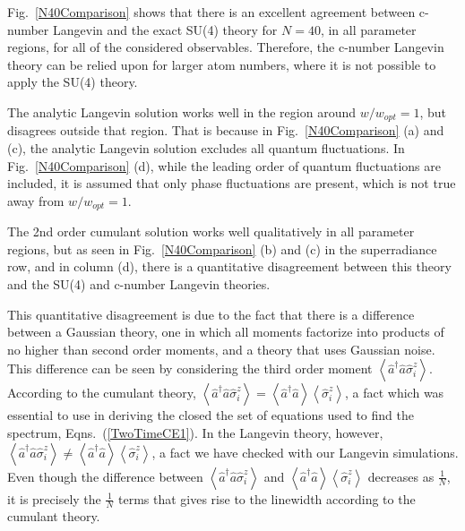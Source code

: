 \documentclass[aps,prl,twocolumn,
superscriptaddress,groupedaddress]{revtex4}
\begin{document}
Fig.~\ref{N40Comparison} shows that there is an excellent agreement
between c-number Langevin and the exact SU(4) theory for $N=40$, in all
parameter regions, for all of the considered observables. Therefore, the
c-number Langevin theory can be relied upon for larger atom numbers,
where it is not possible to apply the SU(4) theory.

The analytic Langevin solution works well in the region around
$w/w_{opt}=1$, but disagrees outside that region. That is because in
Fig.~\ref{N40Comparison} (a) and (c), the analytic Langevin solution
excludes all quantum fluctuations. In Fig.~\ref{N40Comparison} (d),
while the leading order of quantum fluctuations are included, it is
assumed that only phase fluctuations are present, which is not true away
from $w/w_{opt}=1$.

The 2nd order cumulant solution works well qualitatively in all
parameter regions, but as seen in Fig.~\ref{N40Comparison} (b) and (c)
in the superradiance row, and in column (d), there is a quantitative
disagreement between this theory and the SU(4) and c-number Langevin
theories.


This quantitative disagreement is due to the fact that there is a
difference between a Gaussian theory, one in which all moments factorize
into products of no higher than second order moments, and a theory that
uses Gaussian noise. This difference can be seen by considering the
third order moment $\left< \hat{a}^{\dagger}\hat{a}\hat{\sigma}_i^z
\right>$. According to the cumulant theory, $\left<
\hat{a}^{\dagger}\hat{a}\hat{\sigma}_i^z \right>=\left<
\hat{a}^{\dagger}\hat{a}\right> \left<\hat{\sigma}_i^z \right>$, a fact
which was essential to use in deriving the closed the set of equations
used to find the spectrum, Eqns.~(\ref{TwoTimeCE1}). In the Langevin
theory, however, $\left< \hat{a}^{\dagger}\hat{a}\hat{\sigma}_i^z
\right> \neq \left< \hat{a}^{\dagger}\hat{a}\right>
\left<\hat{\sigma}_i^z \right>$, a fact we have checked with our
Langevin simulations. Even though the difference between $\left<
\hat{a}^{\dagger}\hat{a}\hat{\sigma}_i^z \right>$ and $\left<
\hat{a}^{\dagger}\hat{a}\right> \left<\hat{\sigma}_i^z \right>$
decreases as $\frac{1}{N}$, it is precisely the $\frac{1}{N}$ terms that
gives rise to the linewidth according to the cumulant theory.
\end{document}
